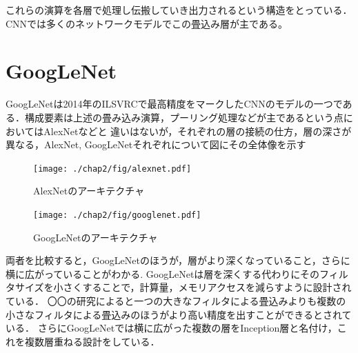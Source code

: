 {これらの演算を各層で処理し伝搬していき出力されるという構造をとっている．
CNNでは多くのネットワークモデルでこの畳込み層が主である。
\section{GoogLeNet}
\label{sec:googlenet}
GoogLeNetは2014年のILSVRCで最高精度をマークしたCNNのモデルの一つである．構成要素は上述の畳み込み演算，プーリング処理などが主であるという点においてはAlexNetなどと
違いはないが，それぞれの層の接続の仕方，層の深さが異なる，AlexNet, GoogLeNetそれぞれについて図にその全体像を示す

\begin{figure}[h]
  \centering
  \texttt{[image: ./chap2/fig/alexnet.pdf]}
  \caption{AlexNetのアーキテクチャ}
  \label{fig:alexnet}
\end{figure}

\begin{figure}[h]
  \centering
  \texttt{[image: ./chap2/fig/googlenet.pdf]}
  \caption{GoogLeNetのアーキテクチャ}
  \label{fig:googlenet}
\end{figure}
両者を比較すると，GoogLeNetのほうが，層がより深くなっていること，さらに横に広がっていることがわかる.
GoogLeNetは層を深くする代わりにそのフィルタサイズを小さくすることで，計算量，メモリアクセスを減らすように設計されている．
〇〇の研究によると一つの大きなフィルタによる畳込みよりも複数の小さなフィルタによる畳込みのほうがより高い精度を出すことができるとされている．
さらにGoogLeNetでは横に広がった複数の層をInception層と名付け，これを複数層重ねる設計をしている．

}
